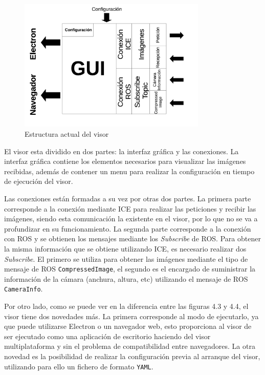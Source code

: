 \begin{figure}[H]
  \begin{center}
    \includegraphics[width=0.8\textwidth]{figures/Camviz2.png}
		\caption{Estructura actual del visor}
		\label{fig.estructuracamviz2}
		\end{center}
\end{figure}

El visor esta dividido en dos partes: la interfaz gráfica y las conexiones. La interfaz gráfica contiene los elementos necesarios para visualizar las imágenes recibidas, además de contener un menu para realizar la configuración en tiempo de ejecución del visor.

Las conexiones están formadas a su vez por otras dos partes. La primera parte corresponde a la conexión mediante ICE para realizar las peticiones y recibir las imágenes, siendo esta comunicación la existente en el visor, por lo que no se va a profundizar en su funcionamiento. La segunda parte corresponde a la conexión con ROS y se obtienen los mensajes mediante los \textit{Subscribe} de ROS. Para obtener la misma información que se obtiene utilizando ICE, es necesario realizar dos \textit{Subscribe}. El primero se utiliza para obtener las imágenes mediante el tipo de mensaje de ROS \texttt{CompressedImage}, el segundo es el encargado de suministrar la información de la cámara (anchura, altura, etc) utilizando el mensaje de ROS \texttt{CameraInfo}.

Por otro lado, como se puede ver en la diferencia entre las figuras 4.3 y 4.4, el visor tiene dos novedades más. La primera corresponde al modo de ejecutarlo, ya que puede utilizarse Electron o un navegador web, esto proporciona al visor de ser ejecutado como una aplicación de escritorio haciendo del visor multiplataforma y sin el problema de compatibilidad entre navegadores. La otra novedad es la posibilidad de realizar la configuración previa al arranque del visor, utilizando para ello un fichero de formato \texttt{YAML}.

